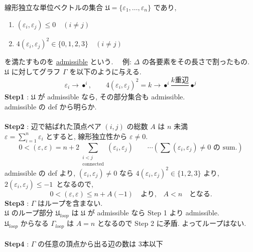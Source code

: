 \documentclass[uplatex,dvipdfmx]{jsarticle}
\begin{document}
\begin{myproof}
    線形独立な単位ベクトルの集合 $\mathfrak{U} = \{\varepsilon_1, \dots, \varepsilon_n\}$ であり,
    \begin{enumerate}
        \item[(i)] $(\varepsilon_i, \varepsilon_j) \le 0 \quad (i \neq j)$
        \item[(ii)] $4(\varepsilon_i, \varepsilon_j)^2 \in \{0, 1, 2, 3\} \quad (i \neq j)$
    \end{enumerate}
    を満たすものを \underline{admissible} という. ~~例: $\Delta$ の各要素をその長さで割ったもの. \\
    $\mathfrak{U}$ に対してグラフ $\Gamma$ を以下のように与える.
    \[
    \varepsilon_i \to \bullet^i, \qquad 4(\varepsilon_i, \varepsilon_j)^2 = k \longrightarrow \bullet^i \frac{k\text{重辺}}{} \bullet^j
    \]
    \textbf{Step1} : $\mathfrak{U}$ が admissible なら, その部分集合も admissible. \\
    admissible の def から明らか.\\\\
    \textbf{Step2} : 辺で結ばれた頂点ペア $(i, j)$ の総数 $A$ は $n$ 未満 \\
    $\varepsilon = \sum_{i=1}^n \varepsilon_i$ とすると, 線形独立性から $\varepsilon \neq 0$.\\
    \begin{equation*}
        0 < (\varepsilon, \varepsilon) = n + 2 \sum_{\substack{i < j \\ \text{connected}}} (\varepsilon_i, \varepsilon_j) \qquad \cdots ( \sum (\varepsilon_i, \varepsilon_j) \neq 0 \text{ の sum.} )
    \end{equation*}
    admissible の def より, $(\varepsilon_i, \varepsilon_j) \neq 0$ なら $4(\varepsilon_i, \varepsilon_j)^2 \in \{1, 2, 3\}$ より, $2(\varepsilon_i, \varepsilon_j) \le -1$~となるので,
    \begin{equation*}
        0 < (\varepsilon, \varepsilon) \le n + A(-1) \quad \text{より,} \quad A < n \quad \text{となる.}
    \end{equation*}
    \textbf{Step3} : $\Gamma$ はループを含まない.\\
    $\mathfrak{U}$ のループ部分 $\mathfrak{U}_{loop}$ は $\mathfrak{U}$ が admissible なら Step 1 より admissible. \\
    $\mathfrak{U}_{loop}$ からなる $\Gamma_{loop}$ は $A = n$ となるので Step 2 に矛盾. よってループはない.\\\\
    \textbf{Step4} : $\Gamma$ の任意の頂点から出る辺の数は 3本以下\\

\end{myproof}
\end{document}
